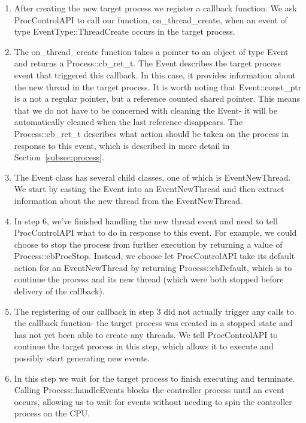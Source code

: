 \begin{enumerate}
\item After creating the new target process we register a callback
function. We ask ProcControlAPI to call our
function, on\_thread\_create, when an event of type EventType::ThreadCreate
occurs in the target process.

\item The on\_thread\_create function takes a pointer to an object of type
Event and returns a Process::cb\_ret\_t. The Event describes the target
process event that triggered
this callback. In this case, it provides information about the new thread in
the target process. It is worth noting that Event::const\_ptr is a not a
regular pointer, but a reference counted shared pointer. This means that we
do not have to be concerned with cleaning the Event- it
will be automatically cleaned when the last reference disappears. The
Process::cb\_ret\_t describes what action should be taken on the process in
response to this event, which is described in more detail in
Section~\ref{subsec:process}.

\item The Event class has several child classes, one of which is EventNewThread.
We start by casting the Event into an EventNewThread and then extract
information about the new thread from the EventNewThread.

\item In step 6, we've finished handling the new thread
event and need to tell ProcControlAPI what to do in response to this event.
For example, we could choose to stop the process from further execution by
returning a value of Process::cbProcStop. Instead, we choose let
ProcControlAPI take its default action for an EventNewThread by returning
Process::cbDefault, which is to continue the process and its new thread (which
were both stopped before delivery of the callback).

\item The registering of our callback in step 3 did not actually trigger any
calls to the callback function- the target process was
created in a stopped state and has not yet been able to create any threads.
We tell ProcControlAPI to continue the target process in this step, which
allows it to execute and possibly start generating new events.

\item In this step we wait for the target process to finish executing and
terminate. Calling Process::handleEvents
blocks the controller process until an event occurs, allowing us to wait for
events without needing to spin the controller process on the CPU.
\end{enumerate}
